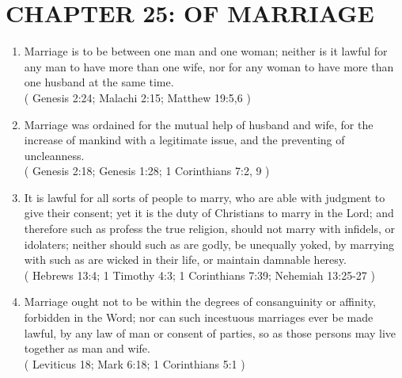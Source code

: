 \documentclass[12pt,a4paper]{book}
\begin{document}
\chapter{CHAPTER 25: OF MARRIAGE}
\label{ch-mar}
\begin{enumerate}
\item Marriage is to be between one man and one woman; neither is it lawful for any man to have more than one wife, nor for any woman to have more than one husband at the same time.\\
( Genesis 2:24; Malachi 2:15; Matthew 19:5,6 )
\item Marriage was ordained for the mutual help of husband and wife, for the increase of mankind with a legitimate issue, and the preventing of uncleanness.\\
( Genesis 2:18; Genesis 1:28; 1 Corinthians 7:2, 9 )
\item It is lawful for all sorts of people to marry, who are able with judgment to give their consent; yet it is the duty of Christians to marry in the Lord; and therefore such as profess the true religion, should not marry with infidels, or idolaters; neither should such as are godly, be unequally yoked, by marrying with such as are wicked in their life, or maintain damnable heresy.\\
( Hebrews 13:4; 1 Timothy 4:3; 1 Corinthians 7:39; Nehemiah 13:25-27 )
\item Marriage ought not to be within the degrees of consanguinity or affinity, forbidden in the Word; nor can such incestuous marriages ever be made lawful, by any law of man or consent of parties, so as those persons may live together as man and wife.\\
( Leviticus 18; Mark 6:18; 1 Corinthians 5:1 )
\end{enumerate}
\end{document}
